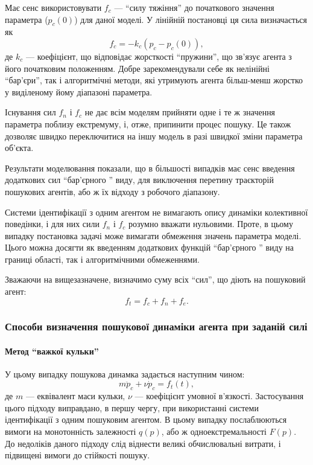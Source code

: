 Має сенс використовувати $f_c$ --- ``силу тяжіння'' до початкового значення параметра
($p_{c}(0)$) для даної моделі. У лінійній постановці ця сила визначається як
%
\begin{equation}
  f_c = -k_c (p_c - p_{c}(0)) ,
  \label{atu:eq:f_c}
\end{equation}
%
де $k_c$ --- коефіцієнт, що відповідає жорсткості ``пружини'',
що зв'язує агента з його початковим положенням.
Добре зарекомендували себе як нелінійні ``бар'єри'',
так і алгоритмічні методи, які утримують агента
більш-менш жорстко у виділеному йому діапазоні параметра.

Існування сил
$f_n$ і $f_c$
не дає всім моделям прийняти одне і те ж значення параметра
поблизу екстремуму, і, отже, припинити процес пошуку. Це також
дозволяє швидко переключитися на іншу модель в разі швидкої
зміни параметра об'єкта.

Результати моделювання показали, що в більшості випадків має
сенс введення додаткових сил ``бар'єрного '' виду, для виключення
перетину траєкторій пошукових агентів, або ж їх відходу з
робочого діапазону.

Системи ідентифікації з одним агентом не вимагають опису
динаміки колективної поведінки, і для них сили
$ f_n $ і
$ f_c $ розумно вважати нульовими. Проте, в цьому випадку постановка
задачі може вимагати обмеження значень параметра моделі. Цього
можна досягти як введенням додаткових функцій ``бар'єрного ''
виду на границі області, так і алгоритмічними обмеженнями.

Зважаючи на вищезазначене, визначимо суму всіх ``сил'',
що діють на пошуковий агент:
\begin{equation}
  f_t = f_c + f_n + f_e .
  \label{atu:eq:f_t}
\end{equation}






\subsubsection{Способи визначення пошукової динаміки агента при заданій силі}  %

\paragraph{Метод ``важкої кульки''}

У цьому випадку пошукова динамка задається наступним чином:
%
\begin{equation}
  m \ddot{p}_c + \nu \dot{p}_c = f_t(t),
  \label{atu:eq:heavy_ball}
\end{equation}
%
де $m$ --- еквівалент маси кульки, $\nu$ --- коефіцієнт умовної в'язкості.
%
Застосування цього підходу виправдано, в першу чергу, при
використанні системи ідентифікації з одним пошуковим агентом. В
цьому випадку послаблюються вимоги на монотонність залежності
$ q (p) $, або ж одноекстремальності
$ F (p) $. До недоліків даного підходу слід віднести великі
обчислювальні витрати, і підвищені вимоги до стійкості пошуку.


